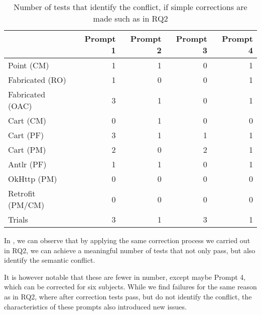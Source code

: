 \begin{table}[t]
    \centering
    \begin{tabular}{@{\extracolsep{\fill}} lrrrr} \toprule
                     & Prompt 1 & Prompt 2 & Prompt 3 & Prompt 4 \\
    \midrule
    Point (CM)       & 1 & 1 & 0 & 1 \\
    Fabricated (RO)  & 1 & 0 & 0 & 1 \\
    Fabricated (OAC) & 3 & 1 & 0 & 1 \\
    Cart (CM)        & 0 & 1 & 0 & 0 \\
    Cart (PF)        & 3 & 1 & 1 & 1 \\
    Cart (PM)        & 2 & 0 & 2 & 1 \\
    Antlr (PF)       & 1 & 1 & 0 & 1 \\
    OkHttp (PM)      & 0 & 0 & 0 & 0 \\
    Retrofit (PM/CM) & 0 & 0 & 0 & 0 \\
    Trials           & 3 & 1 & 3 & 1 \\
    \bottomrule
    \end{tabular}
    \caption{Number of tests that identify the conflict, if simple corrections are made such as in RQ2\label{tab:results:rq3t2}}
\end{table}

In , we can observe that by applying the same correction process we carried out in
RQ2, we can achieve a meaningful number of tests that not only pass, but also identify the semantic conflict.

It is however notable that these are fewer in number, except maybe Prompt 4, which can be corrected for six subjects.
While we find failures for the same reason as in RQ2, where after correction tests pass, but do not identify the conflict,
the characteristics of these prompts also introduced new issues.

